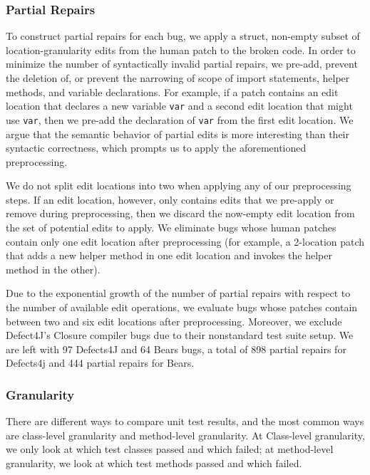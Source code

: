 \documentclass[sigconf, timestamp-false, anonymous=true]{acmart}
\begin{document}
\subsubsection{Partial Repairs}

To construct partial repairs for each bug, we apply a struct, non-empty subset 
of location-granularity edits from the human patch to the broken code.
In order to minimize the number of syntactically invalid partial repairs, 
we pre-add, prevent the deletion of, or prevent the narrowing of scope of 
import statements, helper methods, and variable declarations.
For example, if a patch contains an edit location that declares a new variable 
\texttt{var} and a second edit location that might use \texttt{var}, then we 
pre-add the declaration of \texttt{var} from the first edit location. 
We argue that the semantic behavior of partial edits is more interesting 
than their syntactic correctness, which prompts us to apply the 
aforementioned preprocessing.

We do not split edit locations into two when applying any of our preprocessing steps. 
If an edit location, however, only contains edits that we pre-apply or remove during 
preprocessing, then we discard the now-empty edit location from the set of 
potential edits to apply. We eliminate bugs whose human patches contain only 
one edit location after preprocessing (for example, a 2-location patch that adds a new 
helper method in one edit location and invokes the helper method in the other). 

Due to the exponential growth of the number of partial repairs with respect 
to the number of available edit operations, we evaluate bugs whose patches 
contain between two and six edit locations after preprocessing.
Moreover, we exclude Defect4J's Closure compiler bugs due to 
their nonstandard test suite setup.
We are left with 97 Defects4J and 64 Bears bugs, a total of 898 partial repairs for Defects4j 
and 444 partial repairs for Bears.

\subsubsection{Granularity}

There are different ways to compare unit test results, and the most common ways 
are class-level granularity and method-level granularity. At Class-level granularity, 
we only look at which test classes passed and which failed; at method-level 
granularity, we look at which test methods passed and which failed.
\end{document}
